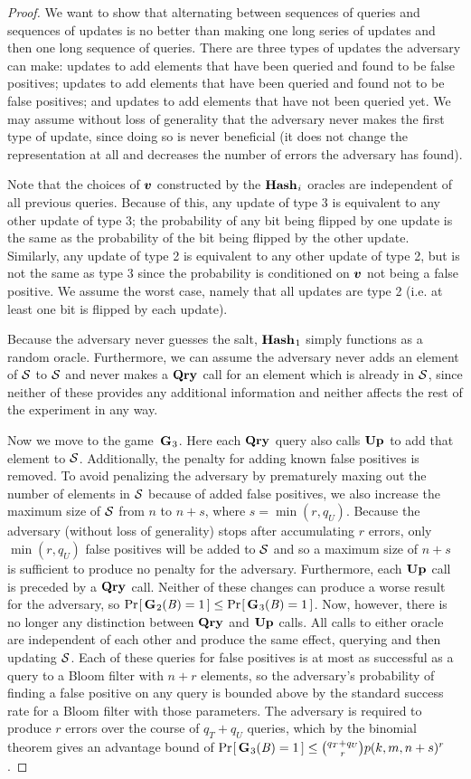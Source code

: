 \begin{proof}
We want to show that alternating between sequences of queries and sequences of
updates is no better than making one long series of updates and then one long
sequence of queries. There are three types of updates the adversary can make:
updates to add elements that have been queried and found to be false positives;
updates to add elements that have been queried and found not to be false
positives; and updates to add elements that have not been queried yet. We may
assume without loss of generality that the adversary never makes the first type
of update, since doing so is never beneficial (it does not change the
representation at all and decreases the number of errors the adversary has
found).

Note that the choices of $\vv$ constructed by the $\mathbf{Hash}\hspace{0.5pt}_i$ oracles are
independent of all previous queries. Because of this, any update of type 3 is
equivalent to any other update of type 3; the probability of any bit being
flipped by one update is the same as the probability of the bit being flipped by
the other update. Similarly, any update of type 2 is equivalent to any other
update of type 2, but is not the same as type 3 since the probability is
conditioned on $\vv$ not being a false positive. We assume the worst case,
namely that all updates are type 2 (i.e. at least one bit is flipped by each
update).

Because the adversary never guesses the salt, $\mathbf{Hash}\hspace{0.5pt}_1$ simply functions as a
random oracle. Furthermore, we can assume the adversary never adds an element of
$\mathcal{S}$ to $\mathcal{S}$ and never makes a $\mathbf{Qry}\hspace{0.5pt}$ call for an element which is already
in $\mathcal{S}$, since neither of these provides any additional information and
neither affects the rest of the experiment in any way.

Now we move to the game~$\mathbf{G}\hspace{0.5pt}_3$. Here each $\mathbf{Qry}\hspace{0.5pt}$ query also calls $\mathbf{Up}\hspace{0.5pt}$ to
add that element to $\mathcal{S}$. Additionally, the penalty for adding known false
positives is removed. To avoid penalizing the adversary by prematurely maxing
out the number of elements in $\mathcal{S}$ because of added false positives, we also
increase the maximum size of $\mathcal{S}$ from $n$ to $n+s$, where $s = \min(r,q_U)$.
Because the adversary (without loss of generality) stops after accumulating $r$
errors, only $\min(r,q_U)$ false positives will be added to $\mathcal{S}$ and so a
maximum size of $n+s$ is sufficient to produce no penalty for the adversary.
Furthermore, each $\mathbf{Up}\hspace{0.5pt}$ call is preceded by a $\mathbf{Qry}\hspace{0.5pt}$ call. Neither of these
changes can produce a worse result for the adversary, so $\Pr\hspace{-1pt}\left[\,\mathbf{G}\hspace{0.5pt}_2(\mathit{B}) =
1\,\right] \le \Pr\hspace{-1pt}\left[\,\mathbf{G}\hspace{0.5pt}_3(\mathit{B}) = 1\,\right]$. Now, however, there is no longer any
distinction between $\mathbf{Qry}\hspace{0.5pt}$ and $\mathbf{Up}\hspace{0.5pt}$ calls. All calls to either oracle are
independent of each other and produce the same effect, querying and then
updating $\mathcal{S}$. Each of these queries for false positives is at most as
successful as a query to a Bloom filter with $n+r$ elements, so the adversary's
probability of finding a false positive on any query is bounded above by the
standard success rate for a Bloom filter with those parameters. The adversary is
required to produce $r$ errors over the course of $q_T+q_U$ queries, which by
the binomial theorem gives an advantage bound of $\Pr\hspace{-1pt}\left[\,\mathbf{G}\hspace{0.5pt}_3(\mathit{B}) = 1\,\right] \le
\binom{q_T+q_U}{r}p(k, m, n+s)^r$.


\end{proof}
